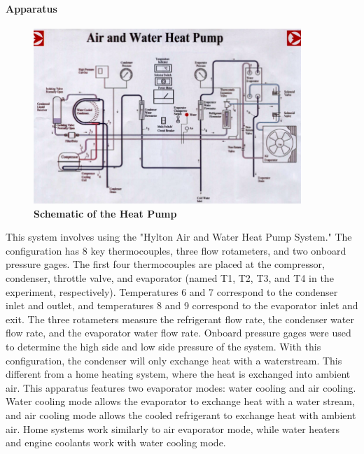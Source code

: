 \documentclass{article}
\begin{document}
\paragraph {Apparatus}
\begin{figure} [H]
	\centering
	\includegraphics[width=0.9\textwidth]{hylton_diagram}
	\caption{\textbf{Schematic of the Heat Pump}}
\end{figure}
This system involves using the "Hylton Air and Water Heat Pump System." %
The configuration has 8 key thermocouples, three flow rotameters, and two onboard pressure gages. The first four thermocouples are placed at the compressor, condenser, throttle valve, and evaporator (named T1, T2, T3, and T4 in the experiment, respectively). Temperatures 6 and 7 correspond to the condenser inlet and outlet, and temperatures 8 and 9 correspond to the evaporator inlet and exit. The three rotameters measure the refrigerant flow rate, the condenser water flow rate, and the evaporator water flow rate. Onboard pressure gages were used to determine the high side and low side pressure of the system. With this configuration, the condenser will only exchange heat with a waterstream. This different from a home heating system, where the heat is exchanged into ambient air. This apparatus features two evaporator modes: water cooling and air cooling. Water cooling mode allows the evaporator to exchange heat with a water stream, and air cooling mode allows the cooled refrigerant to exchange heat with ambient air. Home systems work similarly to air evaporator mode, while water heaters and engine coolants work with water cooling mode. 
 
\end{document}
